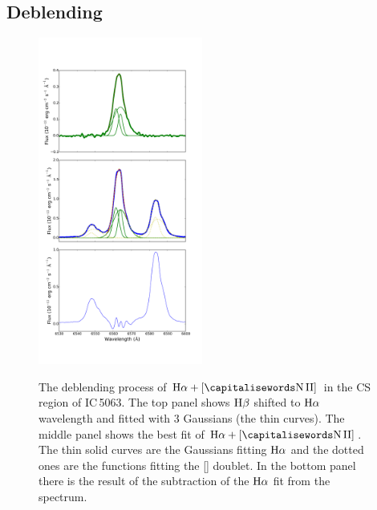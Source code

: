 \documentclass[../main.tex]{subfiles}
\begin{document}
\subsection{Deblending}
\label{sec:deblending}

\begin{figure}
\centering
\includegraphics[width=0.48\textwidth]{images/paper1/ha2.pdf} \\
\caption[]{The deblending process of $\Ha + [\ion{N}{II}]$ in the CS region of IC\,5063. The top panel shows $\rm H\beta$ shifted to $\rm H\alpha$ wavelength and fitted with $3$ Gaussians (the thin curves). The middle panel shows the best fit of $\Ha+[\ion{N}{II}]$. The thin solid curves are the Gaussians fitting $\rm H\alpha$ and the dotted ones are the functions fitting the [] doublet. In the bottom panel there is the result of the subtraction of the $\rm H\alpha$ fit from the spectrum. }
\label{fig:hadeb}
\end{figure}
\end{document}
